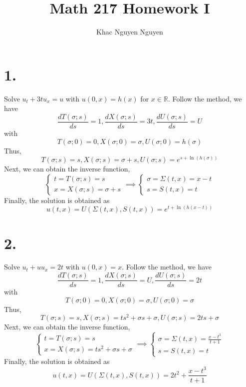\documentclass[11pt]{article}
\title{\textbf{Math 217 Homework I}}
\author{Khac Nguyen Nguyen}
\date{}
\theoremstyle{mystyle}
\theoremstyle{definition}
\begin{document}
\section*{1.}
Solve $u_t + 3tu_x = u$ with $u(0,x) = h(x)$ for $x \in \mathbb{R}$.
Follow the method, we have 
\[
  \displaystyle\frac{dT(\sigma; s)}{ds} = 1, 
  \displaystyle\frac{dX(\sigma; s)}{ds} = 3t, 
  \displaystyle\frac{dU(\sigma; s)}{ds} = U
\]
with 
\[
  T(\sigma; 0) = 0, 
  X(\sigma; 0) = \sigma,
  U(\sigma; 0) = h(\sigma)
\]
Thus, 
\[
  T(\sigma; s) = s, X(\sigma;s) = \sigma + s, U(\sigma; s) = e^{s + \ln(h(\sigma))} 
\]
Next, we can obtain the inverse function, 
\[
  \begin{cases}
    t = T(\sigma;s) = s \\
    x = X(\sigma;s) = \sigma + s
  \end{cases}
  \implies 
  \begin{cases}
    \sigma = \Sigma(t,x) = x - t \\
    s = S(t,x) = t
  \end{cases}
\]
Finally, the solution is obtained as 
\[
  u(t,x) = U(\Sigma(t,x), S(t,x)) = e^{t + \ln(h(x-t))} 
\]
\pagebreak
\section*{2.}
Solve $u_t + u u_x = 2t$ with $u(0,x) = x$. 
Follow the method, we have 
\[
  \displaystyle\frac{dT(\sigma; s)}{ds} = 1, 
  \displaystyle\frac{dX(\sigma; s)}{ds} = U, 
  \displaystyle\frac{dU(\sigma; s)}{ds} = 2t
\]
with 
\[
  T(\sigma;0) = 0, X(\sigma;0) = \sigma, U(\sigma;0) = \sigma
\]
Thus, 
\[
  T(\sigma; s) = s, X(\sigma;s) = ts^2+ \sigma s + \sigma , U(\sigma;s) = 2ts + \sigma
\]
Next, we can obtain the inverse function, 
\[
  \begin{cases}
    t = T(\sigma;s) = s \\
    x = X(\sigma;s) = ts^2 + \sigma s + \sigma
  \end{cases}
  \implies 
  \begin{cases}
    \sigma = \Sigma(t,x) = \displaystyle\frac{x-t^3}{t+1} \\
    s = S(t,x) = t
  \end{cases}
\]
Finally, the solution is obtained as 
\[
  u(t,x) = U(\Sigma(t,x), S(t,x)) = 2t^2 + \displaystyle\frac{x-t^3}{t+1} 
\]
\pagebreak
\end{document}
